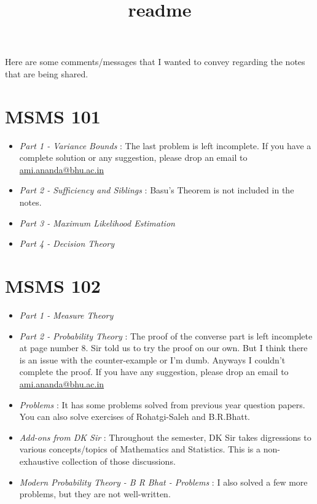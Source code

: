 \documentclass[11pt, a4paper]{article}
\title{readme}
\author{}
\date{}
\begin{document}
\maketitle

Here are some comments/messages that I wanted to convey regarding the notes that are being shared.

\section{MSMS 101}

\begin{itemize}
\item \textit{Part 1 - Variance Bounds} : The last problem is left incomplete. If you have a complete solution or any suggestion, please drop an email to \href{mailto:ami.ananda@bhu.ac.in}{ami.ananda@bhu.ac.in}
	
\item \textit{Part 2 - Sufficiency and Siblings} : Basu's Theorem is not included in the notes.
	
\item \textit{Part 3 - Maximum Likelihood Estimation}
	
\item \textit{Part 4 - Decision Theory}
\end{itemize}


\section{MSMS 102}

\begin{itemize}
\item \textit{Part 1 - Measure Theory}
	
\item \textit{Part 2 - Probability Theory} : The proof of the converse part is left incomplete at page number 8. Sir told us to try the proof on our own. But I think there is an issue with the counter-example or I'm dumb. Anyways I couldn't complete the proof. If you have any suggestion, please drop an email to \href{mailto:ami.ananda@bhu.ac.in}{ami.ananda@bhu.ac.in}
	
\item \textit{Problems} : It has some problems solved from previous year question papers. You can also solve exercises of Rohatgi-Saleh and B.R.Bhatt.
		
\item \textit{Add-ons from DK Sir} : Throughout the semester, DK Sir takes digressions to various concepts/topics of Mathematics and Statistics. This is a non-exhaustive collection of those discussions.
		
\item \textit{Modern Probability Theory - B R Bhat - Problems} : I also solved a few more problems, but they are not well-written.
\end{itemize}
\end{document}
